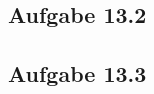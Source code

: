 \documentclass{standalone}
\begin{document}
\subsection{Aufgabe 13.2}


\subsection{Aufgabe 13.3}
\end{document}
